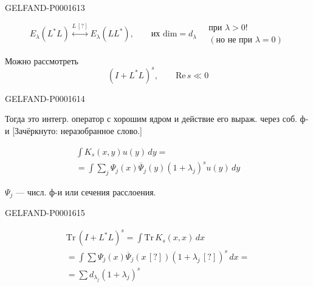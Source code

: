 \begin{GelfandAdjacentEvidence}{GELFAND-P000161}{3}

\begin{equation*}
E_\lambda(L^*L)\overset{L\, [?]}{\longleftrightarrow}E_\lambda(LL^*),\qquad
\text{их }\mathrm{dim}=d_\lambda\quad
\substack{\text{при }\lambda>0!\\(\text{но не при }\lambda=0)}
\end{equation*}
\end{GelfandAdjacentEvidence}


Можно рассмотреть
\begin{equation*}
(I+L^*L)^s,\qquad \mathrm{Re}\,s\ll0
\end{equation*}

\begin{GelfandAdjacentEvidence}{GELFAND-P000161}{4}

Тогда это интегр. оператор с хорошим ядром и действие его выраж. через соб. ф-и
[Зачёркнуто: неразобранное слово.]
\end{GelfandAdjacentEvidence}

\begin{gather*}
\int K_s(x,y)u(y)\,dy=\\
=\int\sum_j\Psi_j(x)\overline{\Psi}_j(y)(1+\lambda_j)^s u(y)\,dy
\end{gather*}

$\Psi_j$ — числ. ф-и или сечения расслоения.

\begin{GelfandAdjacentEvidence}{GELFAND-P000161}{5}

\begin{gather*}
\mathrm{Tr}\,(I+L^*L)^s=\int\mathrm{Tr}\,K_s(x,x)\,dx\\
=\int\sum\Psi_j(x)\overline{\Psi}_j(x\, [?])(1+\lambda_j\, [?])^s\,dx=\\
=\sum d_{\lambda_j}(1+\lambda_j)^s
\end{gather*}
\end{GelfandAdjacentEvidence}



